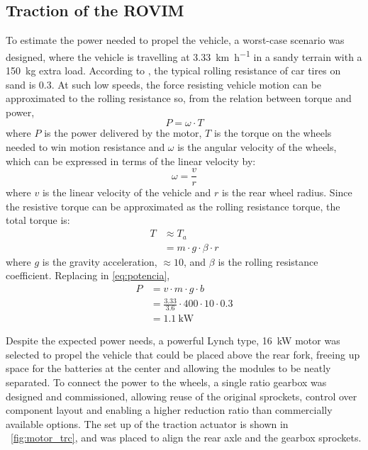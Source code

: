\documentclass[journal]{IEEEtran}
\begin{document}
\subsection{Traction of the ROVIM}

To estimate the power needed to propel the vehicle, a worst-case scenario was designed, where the vehicle is travelling at \SI{3.33}{\kilo\meter\per\hour} in a sandy terrain with a \SI{150}{\kilo\gram} extra load. According to \cite[p. 117]{coefs_atrito}, the typical rolling resistance of car tires on sand is \num{0.3}. At such low speeds, the force resisting vehicle motion can be approximated to the rolling resistance so, from the relation between torque and power,
%
\begin{equation}
P = \omega \cdot T \label{eq:potencia}
\end{equation}
%
where $P$ is the power delivered by the motor, $T$ is the torque on the wheels needed to win motion resistance and $\omega$ is the angular velocity of the wheels, which can be expressed in terms of the linear velocity by:
\begin{equation}
    \omega = \frac{v}{r}%
\end{equation}
%
where $v$ is the linear velocity of the vehicle and $r$ is the rear wheel radius. Since the resistive torque can be approximated as the rolling resistance torque, the total torque is:
%
\begin{align} 
    T &\approx T_{a}\\
      &= m \cdot g \cdot \beta \cdot r \label{eq:binario}
\end{align}
%
where $g$ is the gravity acceleration, $\approx \num{10}$, and $\beta$ is the rolling resistance coefficient. Replacing in \eqref{eq:potencia},
%
\begin{align} \label{eq:potencia_vmb}
    P &= v \cdot m \cdot g \cdot b\\
      &= \frac{3.33}{3.6} \cdot 400 \cdot 10 \cdot 0.3\\
      &= \SI{1.1}{\kilo\watt}
\end{align}

Despite the expected power needs, a powerful Lynch type, \SI{16}{\kilo\watt} motor was selected to propel the vehicle that could be placed above the rear fork, freeing up space for the batteries at the center and allowing the modules to be neatly separated. To connect the power to the wheels, a single ratio gearbox was designed and commissioned, allowing reuse of the original sprockets, control over component layout and enabling a higher reduction ratio than commercially available options. The set up of the traction actuator is shown in \figurename~\ref{fig:motor_trc}, and was placed to align the rear axle and the gearbox sprockets.
\end{document}
